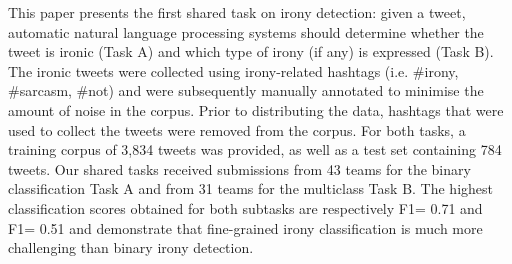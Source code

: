 This paper presents the first shared task on irony detection: given a tweet, automatic natural language processing systems should determine whether the tweet is ironic (Task A) and which type of irony (if any) is expressed (Task B). The ironic tweets were collected using irony-related hashtags (i.e. \#irony, \#sarcasm, \#not) and were subsequently manually annotated to minimise the amount of noise in the corpus. Prior to distributing the data, hashtags that were used to collect the tweets were removed from the corpus. For both tasks, a training corpus of 3,834 tweets was provided, as well as a test set containing 784 tweets. Our shared tasks received submissions from 43 teams for the binary classification Task A and from 31 teams for the multiclass Task B. The highest classification scores obtained for both subtasks are respectively F1= 0.71 and F1= 0.51 and demonstrate that fine-grained irony classification is much more challenging than binary irony detection.
